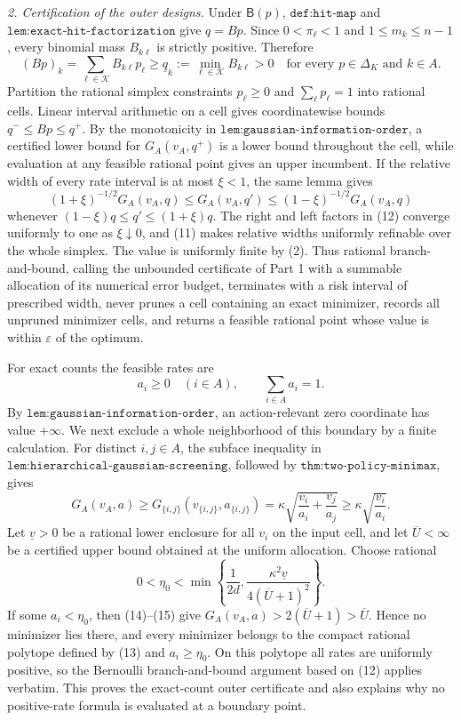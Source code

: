 \emph{2. Certification of the outer designs.}
Under \(\mathsf B(p)\), \(\texttt{def:hit-map}\) and \(\texttt{lem:exact-hit-factorization}\) give \(q=Bp\).  Since \(0<\pi_\ell<1\) and \(1\leq m_k\leq n-1\), every binomial mass \(B_{k\ell}\) is strictly positive.  Therefore
\[
 (Bp)_k=\sum_{\ell\in\mathcal K}B_{k\ell}p_\ell
 \geq \underline q_k:=\min_{\ell\in\mathcal K}B_{k\ell}>0
 \quad\text{for every }p\in\Delta_K\text{ and }k\in A.
\tag{11}
\]
Partition the rational simplex constraints \(p_\ell\geq0\) and \(\sum_\ell p_\ell=1\) into rational cells.  Linear interval arithmetic on a cell gives coordinatewise bounds \(q^-\leq Bp\leq q^+\).  By the monotonicity in \(\texttt{lem:gaussian-information-order}\), a certified lower bound for \(G_A(v_A,q^+)\) is a lower bound throughout the cell, while evaluation at any feasible rational point gives an upper incumbent.  If the relative width of every rate interval is at most \(\xi<1\), the same lemma gives
\[
 (1+\xi)^{-1/2}G_A(v_A,q)
 \leq G_A(v_A,q')
 \leq(1-\xi)^{-1/2}G_A(v_A,q)
\tag{12}
\]
whenever \((1-\xi)q\leq q'\leq(1+\xi)q\).  The right and left factors in (12) converge uniformly to one as \(\xi\downarrow0\), and (11) makes relative widths uniformly refinable over the whole simplex.  The value is uniformly finite by (2).  Thus rational branch-and-bound, calling the unbounded certificate of Part 1 with a summable allocation of its numerical error budget, terminates with a risk interval of prescribed width, never prunes a cell containing an exact minimizer, records all unpruned minimizer cells, and returns a feasible rational point whose value is within \(\varepsilon\) of the optimum.

For exact counts the feasible rates are
\[
 a_i\geq0\quad(i\in A),\qquad \sum_{i\in A}a_i=1.
\tag{13}
\]
By \(\texttt{lem:gaussian-information-order}\), an action-relevant zero coordinate has value \(+\infty\).  We next exclude a whole neighborhood of this boundary by a finite calculation.  For distinct \(i,j\in A\), the subface inequality in \(\texttt{lem:hierarchical-gaussian-screening}\), followed by \(\texttt{thm:two-policy-minimax}\), gives
\[
 G_A(v_A,a)\geq G_{\{i,j\}}(v_{\{i,j\}},a_{\{i,j\}})
 =\kappa\sqrt{\frac{v_i}{a_i}+\frac{v_j}{a_j}}
 \geq\kappa\sqrt{\frac{v_i}{a_i}}.
\tag{14}
\]
Let \(\underline v>0\) be a rational lower enclosure for all \(v_i\) on the input cell, and let \(\overline U<\infty\) be a certified upper bound obtained at the uniform allocation.  Choose rational
\[
 0<\eta_0<\min\left\{\frac1{2d},
 \frac{\kappa^2\underline v}{4(\overline U+1)^2}\right\}.
\tag{15}
\]
If some \(a_i<\eta_0\), then (14)--(15) give \(G_A(v_A,a)>2(\overline U+1)>\overline U\).  Hence no minimizer lies there, and every minimizer belongs to the compact rational polytope defined by (13) and \(a_i\geq\eta_0\).  On this polytope all rates are uniformly positive, so the Bernoulli branch-and-bound argument based on (12) applies verbatim.  This proves the exact-count outer certificate and also explains why no positive-rate formula is evaluated at a boundary point.

